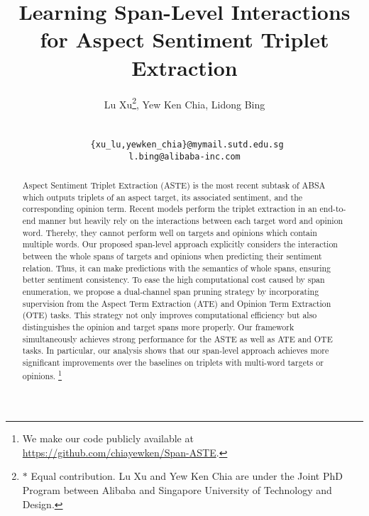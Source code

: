 \documentclass[11pt,a4paper]{article}
\title{Learning Span-Level Interactions for Aspect Sentiment Triplet Extraction}
\author{Lu Xu\affmark[* 1, 2]\thanks{$*$ Equal contribution.  Lu Xu and Yew Ken Chia are under the Joint PhD Program between Alibaba and Singapore University of Technology and Design. },
Yew Ken Chia\affmark[* 1, 2], Lidong Bing\affmark[2]\\
\affaddr{\affmark[1] Singapore University of Technology and Design}\\
\affaddr{\affmark[2] DAMO Academy, Alibaba Group}\\
\tt{ \{xu\_lu,yewken\_chia\}@mymail.sutd.edu.sg}\\
\tt{l.bing@alibaba-inc.com}\\
}
\date{}
\begin{document}
\maketitle
\begin{abstract} 
Aspect Sentiment Triplet Extraction (ASTE) is the most recent subtask of ABSA which outputs triplets of an aspect target, its associated sentiment, and the corresponding opinion term.
Recent models perform the triplet extraction in an end-to-end manner but heavily rely on the interactions 
between each target word and opinion word.
Thereby, they cannot perform well on targets and opinions which contain multiple words.
Our proposed span-level approach explicitly considers the interaction between the whole spans of targets and opinions when predicting their sentiment relation.
Thus, it can make predictions with the semantics of whole spans, ensuring better sentiment consistency.
To ease the high computational cost caused by span enumeration, we propose a dual-channel span pruning strategy by incorporating supervision from the Aspect Term Extraction (ATE) and Opinion Term Extraction (OTE) tasks.
This strategy not only improves computational efficiency but also distinguishes the opinion and target spans more properly.
Our framework simultaneously achieves strong performance for the ASTE as well as ATE and OTE tasks.
In particular, our analysis shows that our span-level approach achieves more significant improvements over the baselines on triplets with multi-word targets or opinions.
\footnote{We make our code publicly available at \url{https://github.com/chiayewken/Span-ASTE}.}

\end{abstract}
\end{document}
